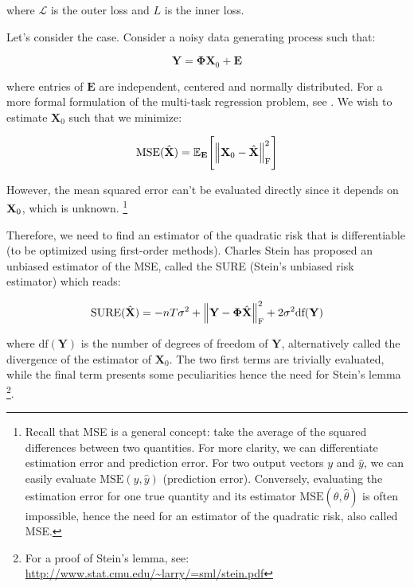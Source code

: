 \documentclass[a4paper,10pt]{article}
\theoremstyle{definition}
\begin{document}
where $\mathcal{L}$ is the outer loss and $L$ is the inner loss.

Let's consider the  case. Consider a noisy data generating process such that:

\begin{equation*}
    \mathbf{Y} = \mathbf{\Phi}\mathbf{X}_0 + \mathbf{E}
\end{equation*}

where entries of $\mathbf{E}$ are independent, centered and normally distributed.
For a more formal formulation of the multi-task regression problem, see \cite{Massias_Fercoq_Gramfort_Salmon17}. We wish to estimate
$\mathbf{X}_0$ such that we minimize:

\begin{equation*}
    \text{MSE}(\hat{\mathbf{X}}) = \mathbb{E}_{\mathbf{E}}\Biggl[ \left \lVert \mathbf{X}_0 - \hat{\mathbf{X}} \right \rVert_{\text{F}}^2 \Biggr]
\end{equation*}

However, the mean squared error can't be evaluated directly since it depends on $\mathbf{X}_0$, which is unknown. \footnote{Recall that
MSE is a general concept: take the average of the squared differences between two quantities. For more clarity, we can differentiate estimation
error and prediction error. For two output vectors $y$ and $\hat{y}$, we can easily evaluate $\text{MSE}(y, \hat{y})$ (prediction error). Conversely,
evaluating the estimation error for one true quantity and its estimator $\text{MSE}(\theta, \hat{\theta})$ is often impossible, hence the need for
an estimator of the quadratic risk, also called MSE.}

Therefore, we need to find an estimator of the quadratic risk that is differentiable (to be optimized using first-order methods). Charles Stein has
proposed an unbiased estimator of the MSE, called the SURE (Stein's unbiased risk estimator) which reads:

\begin{equation*}
    \text{SURE}(\hat{\bf{X}}) = -nT\sigma^2 + \left \lVert \mathbf{Y} - \mathbf{\Phi} \hat{\mathbf{X}} \right \rVert_{\text{F}}^2 + 2 \sigma^2 \text{df}(\bf{Y})
\end{equation*}

where $\text{df}(\mathbf{Y})$ is the number of degrees of freedom of $\mathbf{Y}$, alternatively called the divergence of
the estimator of $\mathbf{X}_0$. The two first terms are trivially evaluated, while the final term presents some
peculiarities hence the need for Stein's lemma \footnote{For a proof of Stein's lemma, see:
\url{http://www.stat.cmu.edu/~larry/=sml/stein.pdf}}.
\end{document}
